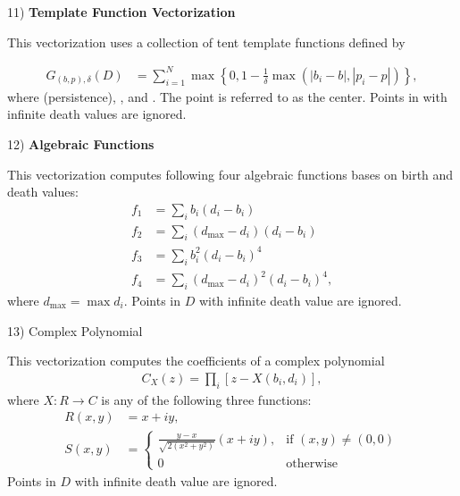 \documentclass[conference, onecolumn]{IEEEtran}
\begin{document}

11) \textbf{Template Function Vectorization}

This vectorization uses a collection of tent template functions defined by

\begin{align*}
  G_{(b,p),\delta}(D) &=
                        \sum_{i=1}^N\max \left\{ 0, 1 - \frac{1}{\delta} \max \left( |b_i - b|, |p_i - p| \right) \right\},  
\end{align*}
where  (persistence), ,  and  . The point  is referred to as the center. Points in  with infinite death values are ignored.

12) \textbf{Algebraic Functions}

This vectorization computes following four algebraic functions bases on birth and death values:
\begin{align}
  f_1 &= \sum_i b_i\left(d_i - b_i\right) \\
  f_2 &= \sum_i \left( d_{\max} - d_i\right) \left(d_i - b_i\right) \\
  f_3 & = \sum_i b_i^2\left(d_i - b_i\right)^4 \\
  f_4 &= \sum_i \left( d_{\max} - d_i\right)^2 \left(d_i - b_i\right)^4,
\end{align}
where $d_{\max} = \max d_i$. Points in $D$ with infinite death value are ignored.

13) Complex Polynomial

This vectorization computes the coefficients of a complex polynomial
\begin{align}
  C_X(z) = \prod_i \left[z - X\left(b_i, d_i\right)\right],
\end{align}
where $X: R \to C$ is any of the following three functions:
\begin{align}
  R(x, y) &= x + i y,\\
  S(x, y) &=
            \begin{cases}
              \frac{y-x}{\sqrt{2(x^2+y^2)}} (x+i y), & \textrm{if } (x,y) \ne (0,0) \\
              0 & \textrm{otherwise}
            \end{cases}
\end{align}
Points in $D$ with infinite death value are ignored.
\end{document}
